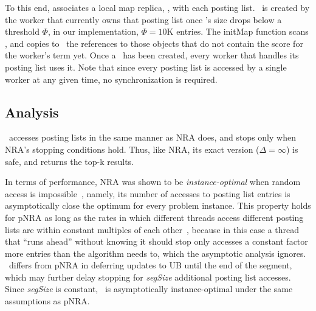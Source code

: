 To this end, \alg\/ associates a local map replica, \TMap, with each posting list. \TMap\ is created by the worker that currently owns that posting list once \DMap's size drops below a threshold $\Phi$,
in our implementation, $\Phi=10$K entries. The {\sc initMap} function scans \DMap, and copies to \TMap\ the references to those \Docobj{} objects that do not contain the score for the worker's term yet.  Once a \TMap\ has been created, every worker that handles its posting list uses it.
Note that since every posting list is accessed by a single worker at any given time, no synchronization is required.
%

\subsection{Analysis}
\label{ssec:analysis}

\alg\ accesses posting lists in the same manner as NRA does, and stops only when NRA's stopping conditions hold. Thus, like NRA, its 
exact version ($\Delta = \infty$) is safe, and returns the top-k results. 

In terms of performance, NRA was shown to be \emph{instance-optimal} when  random access is impossible~\cite{Fagin:2003}, 
namely, its number of accesses to posting list entries is asymptotically close the optimum for every problem instance.  
This property holds for pNRA as long as the rates in which different threads access different posting lists are within constant multiples of each other~\cite{Fagin:2003}, because in this case a thread that ``runs ahead'' without knowing it should stop only accesses a constant factor more entries than the algorithm needs to, which the asymptotic
analysis ignores. \alg\ differs from pNRA in deferring updates to UB until the end of the segment, 
which may further delay stopping for \emph{segSize} additional posting list accesses. Since \emph{segSize} is constant, \alg\ is asymptotically
instance-optimal under the same assumptions as pNRA.


